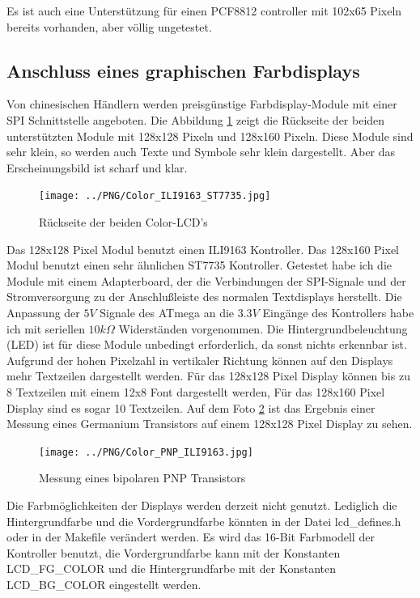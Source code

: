 Es ist auch eine Unterstützung für einen PCF8812 controller mit 102x65 Pixeln bereits vorhanden,
aber völlig ungetestet.

\subsection{Anschluss eines graphischen Farbdisplays}

Von chinesischen Händlern werden preisgünstige Farbdisplay-Module mit einer SPI Schnittstelle angeboten.
Die Abbildung \ref{fig:Color_both} zeigt die Rückseite der beiden unterstützten Module mit 128x128 Pixeln
und 128x160 Pixeln.
Diese Module sind sehr klein, so werden auch Texte und Symbole sehr klein dargestellt.
Aber das Erscheinungsbild ist scharf und klar.

\begin{figure}[H]
\centering
\texttt{[image: ../PNG/Color\_ILI9163\_ST7735.jpg]}
\caption{Rückseite der beiden Color-LCD's}
\label{fig:Color_both}
\end{figure}

Das 128x128 Pixel Modul benutzt einen ILI9163 Kontroller.
Das 128x160 Pixel Modul benutzt einen sehr ähnlichen ST7735 Kontroller.
Getestet habe ich die Module mit einem Adapterboard, der die Verbindungen
der SPI-Signale und der Stromversorgung zu der Anschlußleiste des normalen Textdisplays
herstellt. Die Anpassung der \(5V\) Signale des ATmega an die \(3.3V\) Eingänge des Kontrollers
habe ich mit seriellen \(10k\Omega\) Widerständen vorgenommen.
Die Hintergrundbeleuchtung (LED) ist für diese Module unbedingt erforderlich, da sonst
nichts erkennbar ist.
Aufgrund der hohen Pixelzahl in vertikaler Richtung können auf den Displays mehr Textzeilen dargestellt
werden. Für das 128x128 Pixel Display können bis zu 8 Textzeilen mit einem 12x8 Font dargestellt werden,
Für das 128x160 Pixel Display sind es sogar 10 Textzeilen.
Auf dem Foto \ref{fig:Color_PNP} ist das Ergebnis einer Messung eines Germanium Transistors auf einem
128x128 Pixel Display zu sehen.

\begin{figure}[H]
\centering
\texttt{[image: ../PNG/Color\_PNP\_ILI9163.jpg]}
\caption{Messung eines bipolaren PNP Transistors}
\label{fig:Color_PNP}
\end{figure}

Die Farbmöglichkeiten der Displays werden derzeit nicht genutzt. Lediglich die Hintergrundfarbe
und die Vordergrundfarbe könnten in der Datei lcd\_defines.h oder in der Makefile verändert werden.
Es wird das 16-Bit Farbmodell der Kontroller benutzt, die Vordergrundfarbe kann mit der Konstanten
LCD\_FG\_COLOR und die Hintergrundfarbe mit der Konstanten LCD\_BG\_COLOR eingestellt werden.

